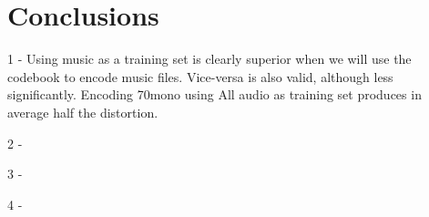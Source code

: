 \documentclass[a4paper, 11pt]{article}
\begin{document}
	
	\section{Conclusions}
	
		1 - Using music as a training set is clearly superior when we will use the codebook to encode music files.
			Vice-versa is also valid, although less significantly. Encoding 70mono using All audio as training set produces in average half the distortion.
		
		2 - 
		
		3 - 
		
		4 - 
		
		
		
		
		
		
\end{document}

